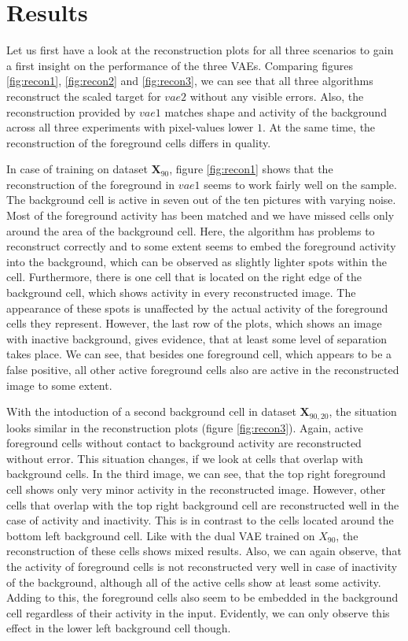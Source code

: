 \documentclass[12pt]{report}
\theoremstyle{definition}
\begin{document}
\section{Results}
Let us first have a look at the reconstruction plots for all three scenarios to gain a first insight on the performance of the three VAEs.
Comparing figures \ref{fig:recon1}, \ref{fig:recon2} and \ref{fig:recon3}, we can see that all three algorithms reconstruct the scaled target for $vae2$ without any visible errors. Also, the reconstruction provided by $vae1$ matches shape and activity of the background across all three experiments with pixel-values lower $1$. At the same time, the reconstruction of the foreground cells differs in quality.

In case of training on dataset $\mathbf{X}_{90}$, figure \ref{fig:recon1} shows that the reconstruction of the foreground in $vae1$ seems to work fairly well on the sample. The background cell is active in seven out of the ten pictures with varying noise. Most of the foreground activity has been matched and we have missed cells only around the area of the background cell. Here, the algorithm has problems to reconstruct correctly and to some extent seems to embed the foreground activity into the background, which can be observed as slightly lighter spots within the cell. Furthermore, there is one cell that is located on the right edge of the background cell, which shows activity in every reconstructed image. The appearance of these spots is unaffected by the actual activity of the foreground cells they represent. However, the last row of the plots, which shows an image with inactive background, gives evidence, that at least some level of separation takes place. We can see, that besides one foreground cell, which appears to be a false positive, all other active foreground cells also are active in the reconstructed image to some extent.

With the intoduction of a second background cell in dataset $\mathbf{X}_{90, 20}$, the situation looks similar in the reconstruction plots (figure \ref{fig:recon3}). Again, active foreground cells without contact to background activity are reconstructed without error. This situation changes, if we look at cells that overlap with background cells. In the third image, we can see, that the top right foreground cell shows only very minor activity in the reconstructed image. However, other cells that overlap with the top right background cell are reconstructed well in the case of activity and inactivity. This is in contrast to the cells located around the bottom left background cell. Like with the dual VAE trained on $X_{90}$, the reconstruction of these cells shows mixed results. Also, we can again observe, that the activity of foreground cells is not reconstructed very well in case of inactivity of the background, although all of the active cells show at least some activity. Adding to this, the foreground cells also seem to be embedded in the background cell regardless of their activity in the input. Evidently, we can only observe this effect in the lower left background cell though.
\end{document}
